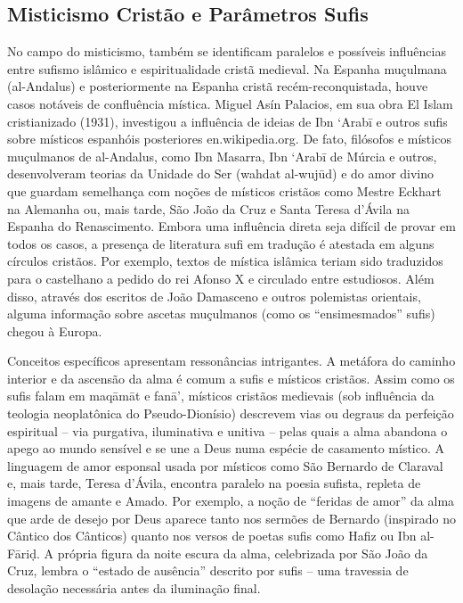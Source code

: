 \subsection{Misticismo Cristão e Parâmetros Sufis}

No campo do misticismo, também se identificam paralelos e possíveis influências entre sufismo islâmico e espiritualidade cristã medieval. Na Espanha muçulmana (al-Andalus) e posteriormente na Espanha cristã recém-reconquistada, houve casos notáveis de confluência mística. Miguel Asín Palacios, em sua obra El Islam cristianizado (1931), investigou a influência de ideias de Ibn ‘Arabī e outros sufis sobre místicos espanhóis posteriores en.wikipedia.org. De fato, filósofos e místicos muçulmanos de al-Andalus, como Ibn Masarra, Ibn ‘Arabī de Múrcia e outros, desenvolveram teorias da Unidade do Ser (wahdat al-wujūd) e do amor divino que guardam semelhança com noções de místicos cristãos como Mestre Eckhart na Alemanha ou, mais tarde, São João da Cruz e Santa Teresa d’Ávila na Espanha do Renascimento. Embora uma influência direta seja difícil de provar em todos os casos, a presença de literatura sufi em tradução é atestada em alguns círculos cristãos. Por exemplo, textos de mística islâmica teriam sido traduzidos para o castelhano a pedido do rei Afonso X e circulado entre estudiosos. Além disso, através dos escritos de João Damasceno e outros polemistas orientais, alguma informação sobre ascetas muçulmanos (como os “ensimesmados” sufis) chegou à Europa.

Conceitos específicos apresentam ressonâncias intrigantes. A metáfora do caminho interior e da ascensão da alma é comum a sufis e místicos cristãos. Assim como os sufis falam em maqāmāt e fanā’, místicos cristãos medievais (sob influência da teologia neoplatônica do Pseudo-Dionísio) descrevem vias ou degraus da perfeição espiritual -- via purgativa, iluminativa e unitiva -- pelas quais a alma abandona o apego ao mundo sensível e se une a Deus numa espécie de casamento místico. A linguagem de amor esponsal usada por místicos como São Bernardo de Claraval e, mais tarde, Teresa d’Ávila, encontra paralelo na poesia sufista, repleta de imagens de amante e Amado. Por exemplo, a noção de “feridas de amor” da alma que arde de desejo por Deus aparece tanto nos sermões de Bernardo (inspirado no Cântico dos Cânticos) quanto nos versos de poetas sufis como Hafiz ou Ibn al-Fāri\d{d}. A própria figura da noite escura da alma, celebrizada por São João da Cruz, lembra o “estado de ausência” descrito por sufis -- uma travessia de desolação necessária antes da iluminação final.


